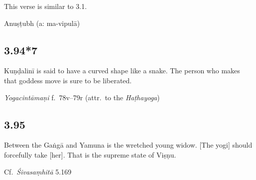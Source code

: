 \begin{ekdosis}
\begin{philcomm}[hp03_094_6]
This verse is similar to 3.1.
\end{philcomm}

\begin{metre}[hp03_094_6]
Anuṣṭubh (a: ma-vipulā)
\end{metre}

\subsection*{3.94*7}
\begin{translation}[hp03_094_7]
Kuṇḍalinī is said to have a curved shape like a snake. The person who makes that goddess move is sure to be liberated.
\end{translation}


\begin{testimonia}[hp03_094_7]
\emph{Yogacintāmaṇi} f.~78v–79r (attr.~to the \emph{Haṭhayoga})
\begin{versinnote}
\end{versinnote}
\end{testimonia}



\subsection*{3.95}
\begin{translation}[hp03_095]
Between the Gaṅgā and Yamuna is the wretched young widow. [The yogi] should forcefully take [her]. That is the supreme state of Viṣṇu.
\end{translation}

\begin{sources}[hp03_095]
Cf.~\emph{Śivasaṃhitā} 5.169
\begin{versinnote}
\end{versinnote}
\end{sources}


\end{ekdosis}
